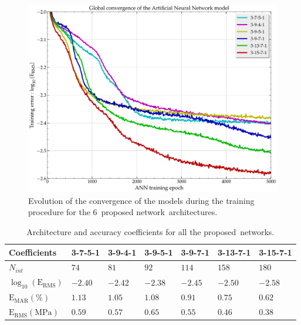 \documentclass[metals,article,accept,pdftex,moreauthors]{Definitions/mdpi}
\DeclareRobustCommand{\RMSE}{\text{E}_\text{RMS}}
\DeclareRobustCommand{\MARE}{\text{E}_\text{MAR}}
\DeclareRobustCommand{\MPa}{\text{MPa}}
\begin{document}
\begin{figure}[H]
\centering
\includegraphics[width=0.7\columnwidth]{Figures/Conv-ANN-6}
\caption{Evolution of the convergence of the models during the training procedure for the \mbox{6 proposed} network~architectures.}
\label{fig:ANN-conv}
\end{figure}
\unskip

\begin{table}[H]
\caption{Architecture and accuracy coefficients for all the proposed~networks.}
\begin{tabularx}{\textwidth}{LCCCCCC}
\toprule
\textbf{Coefficients} & \textbf{3-7-5-1} & \textbf{3-9-4-1} & \textbf{3-9-5-1} & \textbf{3-9-7-1} & \textbf{3-13-7-1} & \textbf{3-15-7-1} \\
\midrule
$N_{int}$ & $74$ & $81$ & $92$ & $114$ & $158$ &$180$\\
\midrule
$\log_{10}(\RMSE)$ & $-2.40$ & $-2.42$ & $-2.38$ & $-2.45$ & $-2.50$ & $-2.58$ \\
$\MARE(\%)$ & $1.13$ & $1.05$ & $1.08$ & $0.91$ & $0.75$ & $0.62$ \\
$\RMSE(\MPa)$ & $0.59$ & $0.57$ & $0.65$ & $0.55$ & $0.46$ & $0.38$ \\
\bottomrule
\end{tabularx}
\label{tab:Errors}
\end{table}
\unskip
\end{document}
